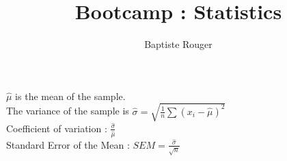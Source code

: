 \documentclass[10pt,a4paper]{article}
\author{Baptiste Rouger}
\title{Bootcamp : Statistics}
\begin{document}
\maketitle

\tableofcontents

\newpage

$\hat{\mu}$ is the mean of the sample.\\

The variance of the sample is $\hat{\sigma} = \sqrt{\frac{1}{n}\sum (x_i - \hat{\mu})^2}$\\

Coefficient of variation : $\frac{\hat{\sigma}}{\hat{\mu}}$\\

Standard Error of the Mean : $SEM = \frac{\hat{\sigma}}{\sqrt{n}}$\\
\end{document}

